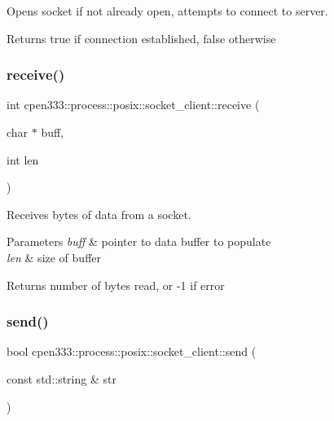 Opens socket if not already open, attempts to connect to server. 

\begin{DoxyReturn}{Returns}
true if connection established, false otherwise 
\end{DoxyReturn}
\mbox{\label{classcpen333_1_1process_1_1posix_1_1socket__client_abab50366bba34ffac44ec8fd47435bec}} 
\subsubsection{\texorpdfstring{receive()}{receive()}}
{\footnotesize\ttfamily int cpen333\+::process\+::posix\+::socket\+\_\+client\+::receive (\begin{DoxyParamCaption}\item[{char $\ast$}]{buff,  }\item[{int}]{len }\end{DoxyParamCaption})\hspace{0.3cm}{\ttfamily [inline]}}



Receives bytes of data from a socket. 


\begin{DoxyParams}{Parameters}
{\em buff} & pointer to data buffer to populate \\
\hline
{\em len} & size of buffer \\
\hline
\end{DoxyParams}
\begin{DoxyReturn}{Returns}
number of bytes read, or -\/1 if error 
\end{DoxyReturn}
\mbox{\label{classcpen333_1_1process_1_1posix_1_1socket__client_a17fee08b05864613e4ba677faa142d3a}} 
\subsubsection{\texorpdfstring{send()}{send()}\hspace{0.1cm}{\footnotesize\ttfamily [1/2]}}
{\footnotesize\ttfamily bool cpen333\+::process\+::posix\+::socket\+\_\+client\+::send (\begin{DoxyParamCaption}\item[{const std\+::string \&}]{str }\end{DoxyParamCaption})\hspace{0.3cm}{\ttfamily [inline]}}



